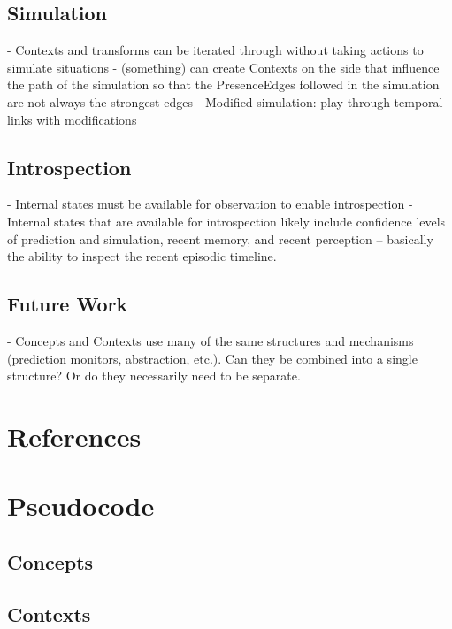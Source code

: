 \documentclass{article}
\begin{document}
\subsection{Simulation}
- Contexts and transforms can be iterated through without taking actions to simulate situations
- (something) can create Contexts on the side that influence the path of the simulation so that the PresenceEdges followed in the simulation are not always the strongest edges
- Modified simulation: play through temporal links with modifications

\subsection{Introspection}
- Internal states must be available for observation to enable introspection
- Internal states that are available for introspection likely include confidence levels of prediction and simulation, recent memory, and recent perception -- basically the ability to inspect the recent episodic timeline.

\subsection{Future Work}
- Concepts and Contexts use many of the same structures and mechanisms (prediction monitors, abstraction, etc.). Can they be combined into a single structure? Or do they necessarily need to be separate.

\section{References}



\appendix
\section{Pseudocode}\label{sec:appx:a}

\subsection{Concepts}\label{pseudocode:concepts}

\subsection{Contexts}\label{pseudocode:contexts}
\end{document}
